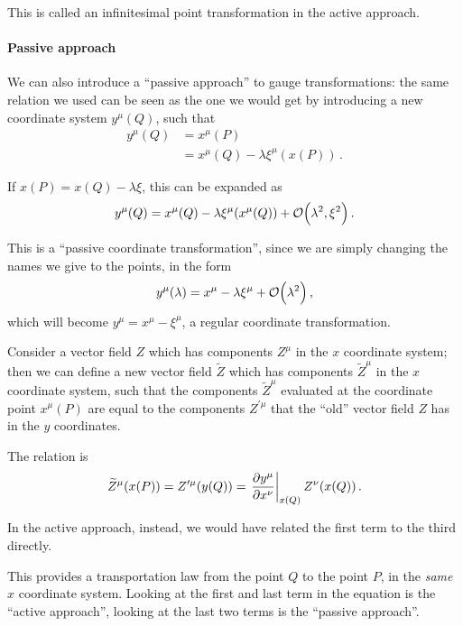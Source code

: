 \documentclass[main.tex]{subfiles}
\begin{document}
This is called an infinitesimal point transformation in the active approach. 

\paragraph{Passive approach}

We can also introduce a ``passive approach'' to gauge transformations: the same relation we used can be seen as the one we would get by introducing a new coordinate system \(y^{\mu } (Q)\), such that 
%
\begin{align}
y^{\mu } (Q) &= x^{\mu } (P)   \\
&= x^{\mu } (Q) - \lambda \xi^{\mu } (x(P))
\,.
\end{align}

If \(x(P) = x(Q) - \lambda \xi\), this can be expanded as 
%
\begin{align}
y^{\mu } (Q) = x^{\mu } (Q) - \lambda \xi^{\mu } (x^{\mu } (Q)) + \order{\lambda^2, \xi^2}
\,.
\end{align}

This is a ``passive coordinate transformation'', since we are simply changing the names we give to the points, in the form 
%
\begin{align}
y^{\mu } (\lambda ) = x^{\mu } - \lambda \xi^{\mu } + \order{\lambda^2}
\,,
\end{align}
%
which will become \(y^{\mu } = x^{\mu } - \xi^{\mu }\), a regular coordinate transformation. 

Consider a vector field \(Z\) which has components \(Z^{\mu }\) in the \(x\) coordinate system; then we can define a new vector field \(\widetilde{Z}\) which has components \(\widetilde{Z}^{\mu }\) in the \(x\) coordinate system, such that the components \(\widetilde{Z}^{\mu }\) evaluated at the coordinate point \(x^{\mu } (P)\) are equal to the components \(Z^{\prime \mu }\) that the ``old'' vector field \(Z\) has in the \(y\) coordinates. 

The relation is 
%
\begin{align}
\widetilde{Z}^{\mu } (x (P)) = Z^{\prime \mu } (y (Q))
= \eval{\pdv{y^{\mu }}{x^{\nu }}}_{x(Q)} Z^{\nu } (x(Q))
\,.
\end{align}

In the active approach, instead, we would have related the first term to the third directly. 

This provides a transportation law from the point \(Q\) to the point \(P\), in the \emph{same} \(x\) coordinate system. 
Looking at the first and last term in the equation is the ``active approach'', looking at the last two terms is the ``passive approach''. 
\end{document}

